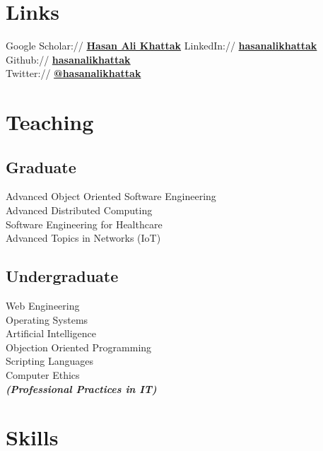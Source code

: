 \documentclass[]{resume-openfont}
\begin{document}
\begin{minipage}[t]{0.33\textwidth}

\section{Links} 
Google Scholar:// \href{https://scholar.google.com.pk/citations?user=dyEt0FUAAAAJ&hl=en}{\bf Hasan Ali Khattak}
LinkedIn://  \href{https://www.linkedin.com/in/hasanalikhattak}{\bf hasanalikhattak} \\
Github:// \href{https://github.com/hasanalikhattak}{\bf hasanalikhattak} \\
Twitter://  \href{https://twitter.com/hasanalikhattak}{\bf @hasanalikhattak} \\


\section{Teaching}
\subsection{Graduate}
Advanced Object Oriented Software Engineering \\
Advanced Distributed Computing\\
Software Engineering for Healthcare \\
Advanced Topics in Networks (IoT)\\
\sectionsep

\subsection{Undergraduate}
Web Engineering \\
Operating Systems \\
Artificial Intelligence \\
Objection Oriented Programming \\
Scripting Languages\\
Computer Ethics \\
{\footnotesize \textit{\textbf{(Professional Practices in IT)}}}



\section{Skills}

\end{minipage}
\end{document}
